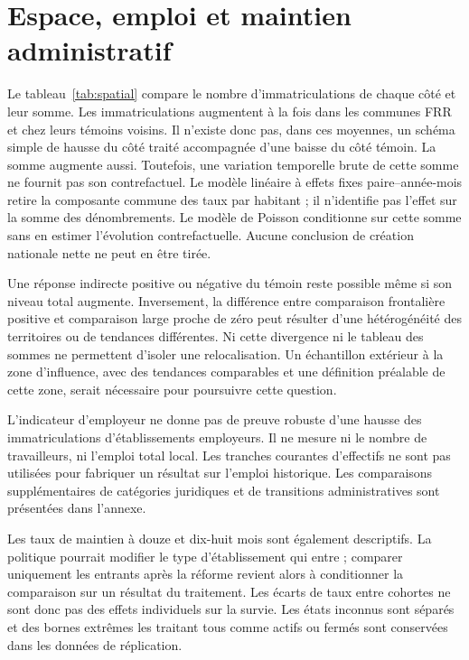 \section{Espace, emploi et maintien administratif}
Le tableau~\ref{tab:spatial} compare le nombre d’immatriculations de chaque côté et leur somme. Les immatriculations augmentent à la fois dans les communes FRR et chez leurs témoins voisins. Il n’existe donc pas, dans ces moyennes, un schéma simple de hausse du côté traité accompagnée d’une baisse du côté témoin. La somme augmente aussi. Toutefois, une variation temporelle brute de cette somme ne fournit pas son contrefactuel. Le modèle linéaire à effets fixes paire–année-mois retire la composante commune des taux par habitant ; il n’identifie pas l’effet sur la somme des dénombrements. Le modèle de Poisson conditionne sur cette somme sans en estimer l’évolution contrefactuelle. Aucune conclusion de création nationale nette ne peut en être tirée.
\begin{table}[htbp]\centering\small\caption{Entrées de part et d’autre des frontières : description en nombres d’immatriculations}\label{tab:spatial}\end{table}

Une réponse indirecte positive ou négative du témoin reste possible même si son niveau total augmente. Inversement, la différence entre comparaison frontalière positive et comparaison large proche de zéro peut résulter d’une hétérogénéité des territoires ou de tendances différentes. Ni cette divergence ni le tableau des sommes ne permettent d’isoler une relocalisation. Un échantillon extérieur à la zone d’influence, avec des tendances comparables et une définition préalable de cette zone, serait nécessaire pour poursuivre cette question.

L’indicateur d’employeur ne donne pas de preuve robuste d’une hausse des immatriculations d’établissements employeurs. Il ne mesure ni le nombre de travailleurs, ni l’emploi total local. Les tranches courantes d’effectifs ne sont pas utilisées pour fabriquer un résultat sur l’emploi historique. Les comparaisons supplémentaires de catégories juridiques et de transitions administratives sont présentées dans l’annexe.

Les taux de maintien à douze et dix-huit mois sont également descriptifs. La politique pourrait modifier le type d’établissement qui entre ; comparer uniquement les entrants après la réforme revient alors à conditionner la comparaison sur un résultat du traitement. Les écarts de taux entre cohortes ne sont donc pas des effets individuels sur la survie. Les états inconnus sont séparés et des bornes extrêmes les traitant tous comme actifs ou fermés sont conservées dans les données de réplication.

